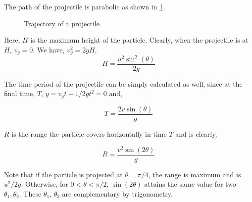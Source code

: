 The path of the projectile is parabolic as shown in \cref{fig: projectile}.

\begin{figure}[H]
    \centering
    \caption{Trajectory of a projectile}
    \label{fig: projectile}
\end{figure}

Here, \(H\) is the maximum height of the particle. Clearly,
when the projectile is at \(H\), \(v_y = 0\). We have, 
\(v_y^2 = 2gH\),
\begin{equation}
    \boxed{H = \frac{u^2\sin^2(\theta)}{2g}}
\end{equation}

The time period of the projectile can be simply calculated as well,
since at the final time, \(T\), \(y = v_yt - 1/2gt^2 = 0\) and,

\begin{equation}
    \boxed{T = \frac{2v\sin(\theta)}{g}}
\end{equation}

\(R\) is the range the particle covers horizontally in time \(T\) and is
clearly,

\begin{equation}
    \boxed{R = \frac{v^2\sin(2\theta)}{g}}
\end{equation}

Note that if the particle is projected at \(\theta = \pi/4\), 
the range is maximum and is \(u^2/2g\). Otherwise,
for \(0 < \theta < \pi/2\), \(\sin(2\theta)\) attains the same 
value for two \(\theta_1, \theta_2\). These \(\theta_1\), \(\theta_2\) are complementary
by trigonometry.

